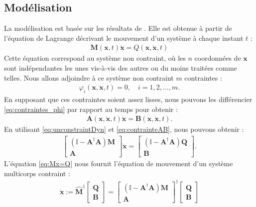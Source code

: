 \subsection{Modélisation}
La modélisation est basée sur les résultats de \cite[Équation (2.15)]{udwadia-phohomsiri}. 
Elle est obtenue à partir de l'équation de Lagrange décrivant le mouvement d'un système à chaque instant $t$ :
\begin{align}
    \label{eq:unconstraintDyn}
    \boldsymbol{M}(\boldsymbol{x},t) \ddot{\boldsymbol{x}} = Q(\boldsymbol{x}, \dot{\boldsymbol{x}}, t)
\end{align}
Cette équation correspond au système non contraint, où les $n$ coordonnées de $\boldsymbol{x}$ sont indépendantes les unes vis-à-vis des autres ou du moins traitées comme telles. Nous allons adjoindre à ce système non contraint $m$ contraintes :
\begin{align}
    \label{eq:contraintes_phi}
    \varphi_{i}(\boldsymbol{x},\dot{\boldsymbol{x}},t) = 0, \quad i=1,2,...,m.
\end{align}
En supposant que ces contraintes soient assez lisses, nous pouvons les différencier \eqref{eq:contraintes_phi} par rapport au temps pour obtenir : 
\begin{align}
    \label{eq:contrainteAB}
    \boldsymbol{A}(\boldsymbol{x},\dot{\boldsymbol{x}}, t) \ddot{\boldsymbol{x}} = \boldsymbol{B}(\boldsymbol{x},\dot{\boldsymbol{x}},t).
\end{align}
En utilisant \eqref{eq:unconstraintDyn} et \eqref{eq:contrainteAB}, nous pouvons obtenir :
\begin{align}
    \label{eq:Mx=Q}
    \begin{bmatrix} (\mathbb{I} - \boldsymbol{A}^{\dag}\boldsymbol{A})\boldsymbol{M} \\ \boldsymbol{A} \end{bmatrix}  \ddot{\boldsymbol{x}}  =  \begin{bmatrix} (\mathbb{I} - \boldsymbol{A}^{\dag}\boldsymbol{A}) \boldsymbol{Q} \\ \boldsymbol{B} \end{bmatrix}.
\end{align}
 L'équation \eqref{eq:Mx=Q} nous fournit l'équation de mouvement d'un système multicorps contraint : 
\begin{align}
\label{eq:udwadia}
    \ddot{\boldsymbol{x}} := \hat{\boldsymbol{M}}^{\dag} \begin{bmatrix} \boldsymbol{Q} \\ \boldsymbol{B} \end{bmatrix}  = \begin{bmatrix} (\mathbb{I} - \boldsymbol{A}^{\dag}\boldsymbol{A})\boldsymbol{M} \\ \boldsymbol{A} \end{bmatrix}^{\dag} \begin{bmatrix} \boldsymbol{Q} \\ \boldsymbol{B} \end{bmatrix}
\end{align}
